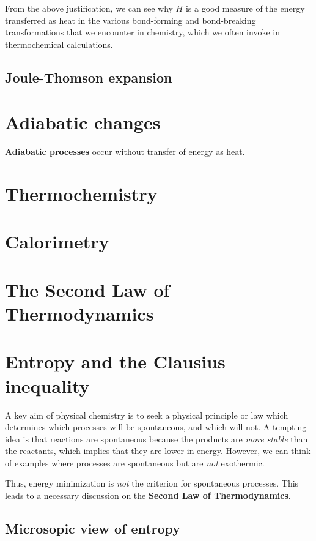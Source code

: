 \documentclass{article}
\numberwithin{theorem}{section}
\numberwithin{corollary}{section}
\numberwithin{postulate}{section}
\numberwithin{lemma}{section}
\numberwithin{definition}{section}
\begin{document}
From the above justification, we can see why $H$ is a good measure of the energy
transferred as heat in the various bond-forming and bond-breaking
transformations that we encounter in chemistry, which we often invoke in
thermochemical calculations.

\subsection{Joule-Thomson expansion}

\section{Adiabatic changes}

\textbf{Adiabatic processes} occur without transfer of energy as heat.

\section{Thermochemistry}

\section{Calorimetry}

\section{The Second Law of Thermodynamics}

\pagebreak

\section{Entropy and the Clausius inequality}

A key aim of physical chemistry is to seek a physical principle or law which
determines which processes will be spontaneous, and which will not. A tempting
idea is that reactions are spontaneous because the products are \textit{more
stable} than the reactants, which implies that they are lower in energy.
However, we can think of examples where processes are spontaneous but are
\textit{not} exothermic. 

Thus, energy minimization is \textit{not} the criterion for spontaneous
processes. This leads to a necessary discussion on the \textbf{Second Law of
Thermodynamics}.

\subsection{Microsopic view of entropy}
\end{document}
